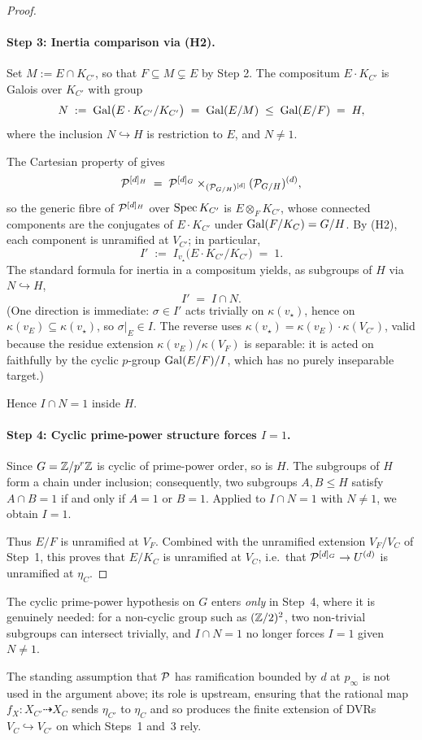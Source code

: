 \documentclass[11pt]{article}
\begin{document}
\begin{proof}
\paragraph{Step 3: Inertia comparison via (H2).}
Set $M := E \cap K_{C'}$, so that $F \subseteq M \subsetneq E$ by Step 2. The
compositum $E \cdot K_{C'}$ is Galois over $K_{C'}$ with group
\[
N \;:=\; \operatorname{Gal}\bigl(E \cdot K_{C'}/K_{C'}\bigr) \;=\; \operatorname{Gal}(E/M)
     \;\leq\; \operatorname{Gal}(E/F) \;=\; H,
\]
where the inclusion $N \hookrightarrow H$ is restriction to $E$, and $N \neq 1$.

The Cartesian property of  gives
\[
\mathcal{P}^{[d]_H} \;=\; \mathcal{P}^{[d]_G} \times_{(\mathcal{P}_{G/H})^{[d]}} (\mathcal{P}_{G/H})^{(d)},
\]
so the generic fibre of $\mathcal{P}^{[d]_H}$ over $\operatorname{Spec} K_{C'}$ is
$E \otimes_F K_{C'}$, whose connected components are the conjugates of
$E \cdot K_{C'}$ under $\operatorname{Gal}(F/K_C) = G/H$. By (H2), each component is
unramified at $V_{C'}$; in particular,
\[
I' \;:=\; I_{v_\star}\!\bigl(E\cdot K_{C'}/K_{C'}\bigr) \;=\; 1 .
\]
The standard formula for inertia in a compositum yields, as subgroups of $H$
via $N \hookrightarrow H$,
\[
I' \;=\; I \cap N .
\]
(One direction is immediate: $\sigma \in I'$ acts trivially on $\kappa(v_\star)$,
hence on $\kappa(v_E) \subseteq \kappa(v_\star)$, so $\sigma|_E \in I$. The
reverse uses $\kappa(v_\star) = \kappa(v_E)\cdot\kappa(V_{C'})$, valid because
the residue extension $\kappa(v_E)/\kappa(V_F)$ is separable: it is acted on
faithfully by the cyclic $p$-group $\operatorname{Gal}(E/F)/I$, which has no purely
inseparable target.)

Hence $I \cap N = 1$ inside $H$.

\paragraph{Step 4: Cyclic prime-power structure forces $I = 1$.}
Since $G = \mathbb{Z}/p^r\mathbb{Z}$ is cyclic of prime-power order, so is $H$. The subgroups
of $H$ form a chain under inclusion; consequently, two subgroups $A, B \leq H$
satisfy $A \cap B = 1$ if and only if $A = 1$ or $B = 1$. Applied to
$I \cap N = 1$ with $N \neq 1$, we obtain $I = 1$.

Thus $E/F$ is unramified at $V_F$. Combined with the unramified extension
$V_F/V_C$ of Step~1, this proves that $E/K_C$ is unramified at $V_C$, i.e.\
that $\mathcal{P}^{[d]_G} \to U^{(d)}$ is unramified at $\eta_C$.
\end{proof}

\begin{remark}
The cyclic prime-power hypothesis on $G$ enters \emph{only} in Step~4, where
it is genuinely needed: for a non-cyclic group such as $(\mathbb{Z}/2)^2$, two
non-trivial subgroups can intersect trivially, and $I \cap N = 1$ no longer
forces $I = 1$ given $N \neq 1$.

The standing assumption that $\mathcal{P}$ has ramification bounded by $d$ at
$p_\infty$ is not used in the argument above; its role is upstream, ensuring
that the rational map $f_X \colon X_{C'} \dashrightarrow X_C$ sends
$\eta_{C'}$ to $\eta_C$ and so produces the finite extension of DVRs
$V_C \hookrightarrow V_{C'}$ on which Steps~1 and~3 rely.
\end{remark}
\end{document}
